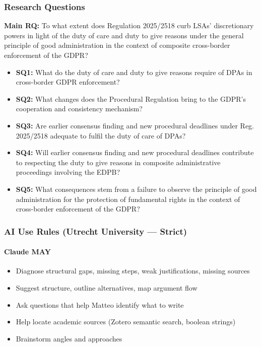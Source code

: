 \subsubsection{Research Questions}

\textbf{Main RQ:} To what extent does Regulation 2025/2518 curb LSAs'
discretionary powers in light of the duty of care and duty to give reasons under
the general principle of good administration in the context of composite
cross-border enforcement of the GDPR?

\begin{itemize}
  \item \textbf{SQ1:} What do the duty of care and duty to give reasons require
        of DPAs in cross-border GDPR enforcement?
  \item \textbf{SQ2:} What changes does the Procedural Regulation bring to the
        GDPR's cooperation and consistency mechanism?
  \item \textbf{SQ3:} Are earlier consensus finding and new procedural deadlines
        under Reg. 2025/2518 adequate to fulfil the duty of care of DPAs?
  \item \textbf{SQ4:} Will earlier consensus finding and new procedural deadlines
        contribute to respecting the duty to give reasons in composite
        administrative proceedings involving the EDPB?
  \item \textbf{SQ5:} What consequences stem from a failure to observe the
        principle of good administration for the protection of fundamental rights
        in the context of cross-border enforcement of the GDPR?
\end{itemize}

\subsubsection{AI Use Rules (Utrecht University --- Strict)}

\paragraph{Claude MAY}
\begin{itemize}
  \item Diagnose structural gaps, missing steps, weak justifications, missing sources
  \item Suggest structure, outline alternatives, map argument flow
  \item Ask questions that help Matteo identify what to write
  \item Help locate academic sources (Zotero semantic search, boolean strings)
  \item Brainstorm angles and approaches
\end{itemize}


